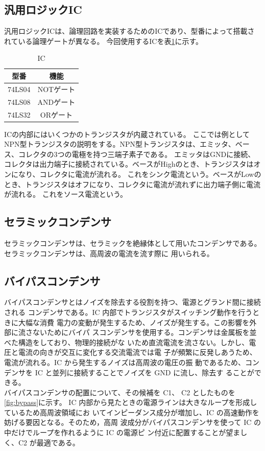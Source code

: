 \documentclass[a4paper,11pt,dvipdfmx]{jsarticle}
\begin{document}
\subsection{汎用ロジックIC}
汎用ロジックICは、論理回路を実装するためのICであり、型番によって搭載されている論理ゲートが異なる。
今回使用するICを表\ref{tab:IC}に示す。
\begin{table}[H]
  \centering
  \caption{IC}
  \begin{tabular}{|c|c|}
    \hline
    型番  &  機能  \\
    \hline
    74LS04 & NOTゲート \\
    74LS08 & ANDゲート \\
    74LS32 & ORゲート \\
    \hline
  \end{tabular}
  \label{tab:IC}
\end{table}
ICの内部にはいくつかのトランジスタが内蔵されている。
ここでは例としてNPN型トランジスタの説明をする。NPN型トランジスタは、エミッタ、ベース、コレクタの3つの電極を持つ三端子素子である。
エミッタはGNDに接続、コレクタは出力端子に接続されている。ベースがHighのとき、トランジスタはオンになり、コレクタに電流が流れる。
これをシンク電流という。ベースがLowのとき、トランジスタはオフになり、コレクタに電流が流れずに出力端子側に電流が流れる。
これをソース電流という。

\subsection{セラミックコンデンサ}
セラミックコンデンサは、セラミックを絶縁体として用いたコンデンサである。セラミックコンデンサは、高周波の電流を流す際に
用いられる。

\subsection{バイパスコンデンサ}
バイパスコンデンサとはノイズを除去する役割を持つ、電源とグランド間に接続される
コンデンサである。IC 内部でトランジスタがスイッチング動作を行うときに大幅な消費
電力の変動が発生するため、ノイズが発生する。この影響を外部に流さないためにバイパ
スコンデンサを使用する。コンデンサは金属板を並べた構造をしており、物理的接続がな
いため直流電流を流さない。しかし、電圧と電流の向きが交互に変化する交流電流では電
子が頻繁に反発しあうため、電流が流れる。IC から発生するノイズは高周波の電圧の振
動であるため、コンデンサを IC と並列に接続することでノイズを GND に流し、除去す
ることができる。\\
バイパスコンデンサの配置について、その候補を C1、 C2 としたものを\ref{fig:bypass}に示す。
IC 内部から見たときの電源ラインは大きなループを形成しているため高周波領域にお
いてインピーダンス成分が増加し、IC の高速動作を妨げる要因となる。そのため，高周
波成分がバイパスコンデンサを使って IC の中だけでループを作れるように IC の電源ピ
ン付近に配置することが望ましく、C2 が最適である。
\end{document}
